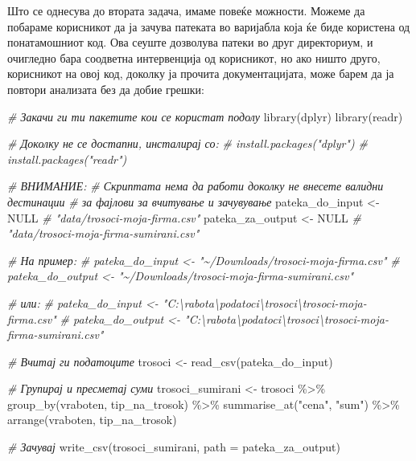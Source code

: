 \documentclass[
]{book}
\newenvironment{Shaded}{\begin{snugshade}}{\end{snugshade}}
\newcommand{\AttributeTok}[1]{\textcolor[rgb]{0.77,0.63,0.00}{#1}}
\newcommand{\CommentTok}[1]{\textcolor[rgb]{0.56,0.35,0.01}{\textit{#1}}}
\newcommand{\ConstantTok}[1]{\textcolor[rgb]{0.00,0.00,0.00}{#1}}
\newcommand{\FunctionTok}[1]{\textcolor[rgb]{0.00,0.00,0.00}{#1}}
\newcommand{\NormalTok}[1]{#1}
\newcommand{\OtherTok}[1]{\textcolor[rgb]{0.56,0.35,0.01}{#1}}
\newcommand{\SpecialCharTok}[1]{\textcolor[rgb]{0.00,0.00,0.00}{#1}}
\newcommand{\StringTok}[1]{\textcolor[rgb]{0.31,0.60,0.02}{#1}}
\begin{document}
Што се однесува до втората задача, имаме повеќе можности. Можеме да побараме корисникот да ја зачува патеката во варијабла која ќе биде користена од понатамошниот код. Ова сеуште дозволува патеки во друг директориум, и очигледно бара соодветна интервенција од корисникот, но ако ништо друго, корисникот на овој код, доколку ја прочита документацијата, може барем да ја повтори анализата без да добие грешки:

\begin{Shaded}
\begin{Highlighting}[]
\CommentTok{\# Закачи ги ти пакетите кои се користат подолу }
\FunctionTok{library}\NormalTok{(dplyr)}
\FunctionTok{library}\NormalTok{(readr)}

\CommentTok{\# Доколку не се достапни, инсталирај со:}
\CommentTok{\# install.packages("dplyr")}
\CommentTok{\# install.packages("readr")}

\CommentTok{\# ВНИМАНИЕ:}
\CommentTok{\# Скриптата нема да работи доколку не внесете валидни дестинации}
\CommentTok{\# за фајлови за вчитување и зачувување}
\NormalTok{pateka\_do\_input }\OtherTok{\textless{}{-}} \ConstantTok{NULL} \CommentTok{\# "data/trosoci{-}moja{-}firma.csv"}
\NormalTok{pateka\_za\_output }\OtherTok{\textless{}{-}} \ConstantTok{NULL} \CommentTok{\# "data/trosoci{-}moja{-}firma{-}sumirani.csv"}

\CommentTok{\# На пример:}
\CommentTok{\# pateka\_do\_input \textless{}{-} "\textasciitilde{}/Downloads/trosoci{-}moja{-}firma.csv" }
\CommentTok{\# pateka\_do\_output \textless{}{-} "\textasciitilde{}/Downloads/trosoci{-}moja{-}firma{-}sumirani.csv" }

\CommentTok{\# или:}
\CommentTok{\# pateka\_do\_input \textless{}{-} "C:\textbackslash{}rabota\textbackslash{}podatoci\textbackslash{}trosoci\textbackslash{}trosoci{-}moja{-}firma.csv"}
\CommentTok{\# pateka\_do\_output \textless{}{-} "C:\textbackslash{}rabota\textbackslash{}podatoci\textbackslash{}trosoci\textbackslash{}trosoci{-}moja{-}firma{-}sumirani.csv"}

\CommentTok{\# Вчитај ги податоците}
\NormalTok{trosoci }\OtherTok{\textless{}{-}} \FunctionTok{read\_csv}\NormalTok{(pateka\_do\_input)}

\CommentTok{\# Групирај и пресметај суми}
\NormalTok{trosoci\_sumirani }\OtherTok{\textless{}{-}}\NormalTok{ trosoci }\SpecialCharTok{\%\textgreater{}\%} 
  \FunctionTok{group\_by}\NormalTok{(vraboten, tip\_na\_trosok) }\SpecialCharTok{\%\textgreater{}\%} 
  \FunctionTok{summarise\_at}\NormalTok{(}\StringTok{"cena"}\NormalTok{, }\StringTok{"sum"}\NormalTok{) }\SpecialCharTok{\%\textgreater{}\%} 
  \FunctionTok{arrange}\NormalTok{(vraboten, tip\_na\_trosok)}

\CommentTok{\# Зачувај}
\FunctionTok{write\_csv}\NormalTok{(trosoci\_sumirani, }
          \AttributeTok{path =}\NormalTok{ pateka\_za\_output)}
\end{Highlighting}
\end{Shaded}
\end{document}
